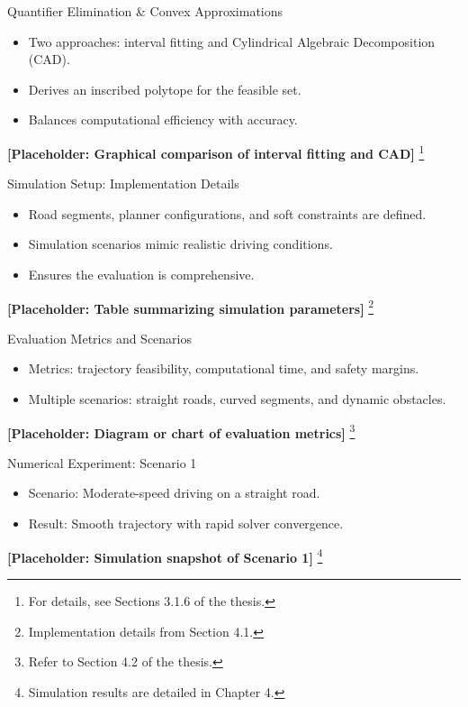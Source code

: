 \documentclass[shortpres,aspectratio=43]{beamer}
\newcommand\blfootnote[1]{%
  \begingroup
  \renewcommand\thefootnote{}\footnote{#1}%
  \addtocounter{footnote}{-1}%
  \endgroup
}
\begin{document}
\begin{frame}{Quantifier Elimination \& Convex Approximations}
  \begin{itemize}
    \item Two approaches: interval fitting and Cylindrical Algebraic Decomposition (CAD).
    \item Derives an inscribed polytope for the feasible set.
    \item Balances computational efficiency with accuracy.
  \end{itemize}
  \centering
  \textbf{[Placeholder: Graphical comparison of interval fitting and CAD]}
  \blfootnote{\tiny For details, see Sections 3.1.6 of the thesis.}
\end{frame}

\begin{frame}{Simulation Setup: Implementation Details}
  \begin{itemize}
    \item Road segments, planner configurations, and soft constraints are defined.
    \item Simulation scenarios mimic realistic driving conditions.
    \item Ensures the evaluation is comprehensive.
  \end{itemize}
  \centering
  \textbf{[Placeholder: Table summarizing simulation parameters]}
  \blfootnote{\tiny Implementation details from Section 4.1.}
\end{frame}

\begin{frame}{Evaluation Metrics and Scenarios}
  \begin{itemize}
    \item Metrics: trajectory feasibility, computational time, and safety margins.
    \item Multiple scenarios: straight roads, curved segments, and dynamic obstacles.
  \end{itemize}
  \centering
  \textbf{[Placeholder: Diagram or chart of evaluation metrics]}
  \blfootnote{\tiny Refer to Section 4.2 of the thesis.}
\end{frame}

\begin{frame}{Numerical Experiment: Scenario 1}
  \begin{itemize}
    \item Scenario: Moderate-speed driving on a straight road.
    \item Result: Smooth trajectory with rapid solver convergence.
  \end{itemize}
  \centering
  \textbf{[Placeholder: Simulation snapshot of Scenario 1]}
  \blfootnote{\tiny Simulation results are detailed in Chapter 4.}
\end{frame}
\end{document}

